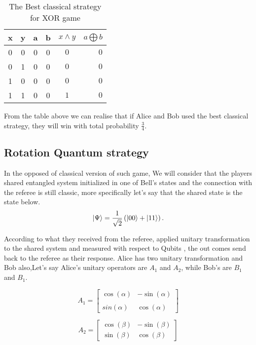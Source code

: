 \begin {table}[htp]
\begin{center}
\begin{tabular}{ |c|c|c|c|c r| }
  \hline
  x & y & a & b &  $x \wedge y $ & $a\bigoplus b$\\
  \hline 
  0 & 0 & 0 & 0&$0$  & $0$\\
  \hline
  0 &1 & 0 & 0 &$0$  & $0$\\
  \hline
   1 & 0 & 0 & 0 &$0$ &  $0$\\
  \hline
  1 & 1 & 0 & 0 &$1$  & $0$\\
  \hline
\end{tabular}
\caption {The Best classical strategy for XOR game }
\end{center}
\end{table}
From the table above we can realise that if Alice and Bob used the best classical strategy, they will win with total probability $\frac{3}{4}$.
\subsection{Rotation Quantum strategy}\hfill \break

In the opposed of classical version of such game, We will consider that the players shared entangled system initialized in one of Bell's states and the connection with the referee is still classic, more specifically let's say that the shared state is the state below.
\begin{equation}
\ket{\Psi }= \frac{1}{\sqrt{2}}\left( \ket{00} +\ket{11} \right)\label{eq1} .
\end{equation}
	  
	  
According to what they received from the referee, applied unitary transformation to the shared system  and measured with respect to  Qubits , the out comes send back to the referee as their response. Alice has two unitary transformation and Bob also,Let's say Alice's unitary operators  are $A_1$ and $A_2$, while Bob's are $B_1$ and $B_1$.
	 
$$	A_1= \begin{bmatrix}
\cos(\alpha) & -\sin(\alpha)\\
\\sin(\alpha) &  \cos(\alpha)
\end{bmatrix}$$	

	
 $$	A_2= \begin{bmatrix}
 \cos(\beta)  &  -\sin(\beta) \\
  \sin(\beta) &  \cos(\beta)
 \end{bmatrix}
 $$
 	

